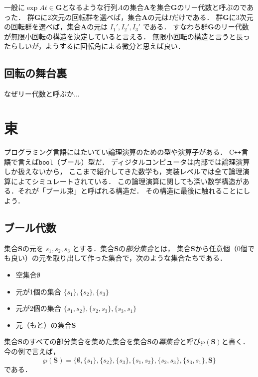\documentclass{jsbook}
\newcommand{\cxx}{\textrm{C}\texttt{++}}
\newcommand{\ccode}[1]{\texttt{#1}}
\newcommand{\keyword}[1]{\emph{#1}}
\newcommand{\bg}[1]{\mathbf{#1}}
\begin{document}
一般に$\exp At\in\bg{G}$となるような行列$A$の集合$\bg{A}$を集合$\bg{G}$のリー代数と呼ぶのであった．
群$\bg{G}$に2次元の回転群を選べば，集合$\bg{A}$の元は$I$だけである．
群$\bg{G}$に3次元の回転群を選べば，集合$\bg{A}$の元は $I_1',I_2',I_3'$ である．
すなわち群$\bg{G}$のリー代数が無限小回転の構造を決定していると言える．
無限小回転の構造と言うと長ったらしいが，ようするに回転角による微分と思えば良い．

\section{回転の舞台裏}

なぜリー代数と呼ぶか...


\chapter{束}

プログラミング言語にはたいてい論理演算のための型や演算子がある．
\cxx 言語で言えば\ccode{bool}（ブール）型だ．
ディジタルコンピュータは内部では論理演算しか扱えないから，
ここまで紹介してきた数学も，実装レベルでは全て論理演算によてシミュレートされている．
この論理演算に関しても深い数学構造がある．それが「ブール束」と呼ばれる構造だ．
その構造に最後に触れることにしよう．

\section{ブール代数}

集合$\bg{S}$の元を $s_1,s_2,s_3$ とする．集合$\bg{S}$の\keyword{部分集合}とは，
集合$\bg{S}$から任意個（0個でも良い）の元を取り出して作った集合で，次のような集合たちである．
\begin{itemize}
\item 空集合$\emptyset$
\item 元が1個の集合 $\{s_1\},\{s_2\},\{s_3\}$
\item 元が2個の集合 $\{s_1,s_2\},\{s_2,s_3\},\{s_3,s_1\}$
\item 元（もと）の集合$\bg{S}$
\end{itemize}
集合$\bg{S}$のすべての部分集合を集めた集合を集合$\bg{S}$の\keyword{冪集合}と呼び$\wp(\bg{S})$と書く．
今の例で言えば，
\begin{equation}
\wp(\bg{S})=\{\emptyset,\{s_1\},\{s_2\},\{s_3\},\{s_1,s_2\},\{s_2,s_3\},\{s_3,s_1\},\bg{S}\}
\end{equation}
である．
\end{document}
